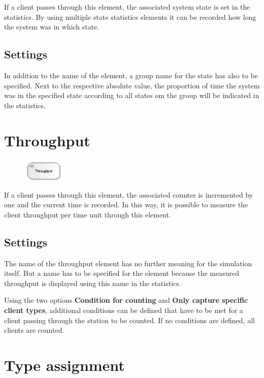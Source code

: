 If a client passes through this element, the associated system state is set in the statistics.
By using multiple state statistics elements it can be recorded how long the system
was in which state.

\subsection*{Settings}

In addition to the name of the element, a group name for the state has also to be specified.
Next to the respective absolute value, the proportion of time the system was in the specified
state according to all states om the group will be indicated in the statistics.


\section{Throughput}
\label{ref:ModelElementThroughput}

\begin{figure}
\vspace{-22pt}
\includegraphics[width=2cm]{imageModelElementThroughput.png}
\vspace{-22pt}
\end{figure}

If a client passes through this element, the associated counter is incremented by one
and the current time is recorded. In this way, it is possible to measure the client
throughput per time unit through this element.

\subsection*{Settings}

The name of the throughput element has no further meaning for the simulation itself.
But a name has to be specified for the element because the measured throughput is
displayed using this name in the statistics.

Using the two options \textbf{Condition for counting} and \textbf{Only capture specific client types},
additional conditions can be defined that have to be met for a client passing through the station to be counted.
If no conditions are defined, all clients are counted.


\section{Type assignment}
\label{ref:ModelElementAssign}

